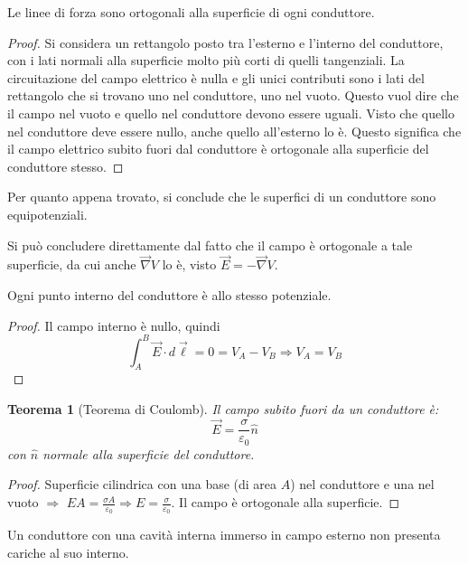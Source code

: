 \documentclass[a4paper]{scrartcl}
\numberwithin{equation}{subsection}
\theoremstyle{style1}
\newtheorem{teorema}{Teorema}[section]
\newenvironment{boxenv}[1][]{
    \begin{eqbox}[#1]
    }{
   \end{eqbox}
}
\begin{document}
Le linee di forza sono ortogonali alla superficie di ogni conduttore.
\begin{boxenv}[]
\begin{proof}
	Si considera un rettangolo posto tra l'esterno e l'interno del conduttore, con i lati normali alla superficie molto pi\`u corti di quelli tangenziali. La circuitazione del campo elettrico \`e nulla e gli unici contributi sono i lati del rettangolo che si trovano uno nel conduttore, uno nel vuoto. Questo vuol dire che il campo nel vuoto e quello nel conduttore devono essere uguali. Visto che quello nel conduttore deve essere nullo, anche quello all'esterno lo \`e. Questo significa che il campo elettrico subito fuori dal conduttore \`e ortogonale alla superficie del conduttore stesso.
\end{proof}
\end{boxenv}
\noindent Per quanto appena trovato, si conclude che le superfici di un conduttore sono equipotenziali.
\begin{boxenv}[]
	Si pu\`o concludere direttamente dal fatto che il campo \`e ortogonale a tale superficie, da cui anche $\vec{\nabla }V$ lo \`e, visto $\vec{E} = - \vec{\nabla }V$.
\end{boxenv}
\noindent Ogni punto interno del conduttore \`e allo stesso potenziale.
\begin{boxenv}
	\begin{proof}
		Il campo interno \`e nullo, quindi 
		\[
		\int_{A} ^B \vec{E}\cdot d\vec{\ell } = 0 = V_A - V_B \Rightarrow V_A = V_B
		\] 
	\end{proof}
\end{boxenv}
\begin{teorema}
	[Teorema di Coulomb]
	Il campo subito fuori da un conduttore \`e:
	\begin{equation}
		\vec{E} = \frac{\sigma}{\varepsilon _0} \hat{n}
	\end{equation}
	con $\hat{n}$ normale alla superficie del conduttore.
\end{teorema}
\begin{boxenv}[]
\begin{proof}
	Superficie cilindrica con una base (di area $A$) nel conduttore e una nel vuoto $\Rightarrow $ $EA = \frac{\sigma A}{\varepsilon _0}\Rightarrow E = \frac{\sigma}{\varepsilon _0}$. Il campo \`e ortogonale alla superficie.
\end{proof}
\end{boxenv}
\noindent Un conduttore con una cavit\`a interna immerso in campo esterno non presenta cariche al suo interno.
\end{document}
